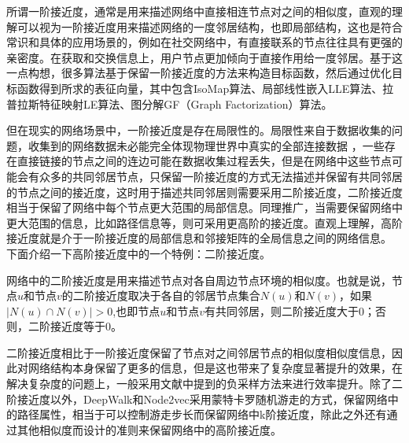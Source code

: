 所谓一阶接近度，通常是用来描述网络中直接相连节点对之间的相似度，直观的理解可以视为一阶接近度用来描述网络的一度邻居结构，也即局部结构，这也是符合常识和具体的应用场景的，例如在社交网络中，有直接联系的节点往往具有更强的亲密度。在获取和交换信息上，用户节点更加倾向于直接作用给一度邻居。基于这一点构想，很多算法基于保留一阶接近度的方法来构造目标函数，然后通过优化目标函数得到所求的表征向量，其中包含IsoMap算法、局部线性嵌入LLE算法、拉普拉斯特征映射LE算法、图分解GF\cite{ahmed2013distributed}（Graph  Factorization）算法。

但在现实的网络场景中，一阶接近度是存在局限性的。局限性来自于数据收集的问题，收集到的网络数据未必能完全体现物理世界中真实的全部连接数据\cite{liben2007link} ，一些存在直接链接的节点之间的连边可能在数据收集过程丢失，但是在网络中这些节点可能会有众多的共同邻居节点，只保留一阶接近度的方式无法描述并保留有共同邻居的节点之间的接近度，这时用于描述共同邻居则需要采用二阶接近度，二阶接近度相当于保留了网络中每个节点更大范围的局部信息。同理推广，当需要保留网络中更大范围的信息，比如路径信息等，则可采用更高阶的接近度。直观上理解，高阶接近度就是介于一阶接近度的局部信息和邻接矩阵的全局信息之间的网络信息。
下面介绍一下高阶接近度中的一个特例：二阶接近度。

\label{second_order}
网络中的二阶接近度是用来描述节点对各自周边节点环境的相似度。也就是说，节点$u$和节点$v$的二阶接近度取决于各自的邻居节点集合$N(u)$和$N(v)$，如果$|N(u) \cap N(v)|>0$,也即节点$u$和节点$v$有共同邻居，则二阶接近度大于0；否则，二阶接近度等于0。

二阶接近度相比于一阶接近度保留了节点对之间邻居节点的相似度相似度信息，因此对网络结构本身保留了更多的信息，但是这也带来了复杂度显著提升的效果，在解决复杂度的问题上，一般采用文献\cite{mikolov2013distributed}中提到的负采样方法来进行效率提升。除了二阶接近度以外，DeepWalk和Node2vec采用蒙特卡罗随机游走的方式，保留网络中的路径属性，相当于可以控制游走步长而保留网络中k阶接近度，除此之外还有通过其他相似度而设计的准则来保留网络中的高阶接近度\cite{ou2016asymmetric}。

